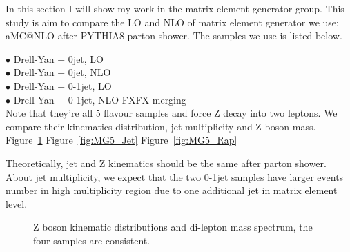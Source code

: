 \documentclass[12pt]{article} %
\begin{document}
In this section I will show my work in the matrix element generator group. This study is aim to compare the LO and NLO of matrix element generator we use: aMC@NLO after PYTHIA8 parton shower. The samples we use is listed below.

\noindent
$\bullet$ Drell-Yan + 0jet, LO \\
$\bullet$ Drell-Yan + 0jet, NLO \\
$\bullet$ Drell-Yan + 0-1jet, LO \\
$\bullet$ Drell-Yan + 0-1jet, NLO FXFX merging \\

Note that they're all 5 flavour samples and force Z decay into two leptons. We compare their kinematics distribution, jet multiplicity and Z boson mass. Figure~\ref{fig:MG5_Z} Figure~\ref{fig:MG5_Jet} Figure~\ref{fig:MG5_Rap}

Theoretically, jet and Z kinematics should be the same after parton shower. About jet multiplicity, we expect that the two 0-1jet samples have larger events number in high multiplicity region due to one additional jet in matrix element level.



\begin{figure}[H] %
  \caption{Z boson kinematic distributions and di-lepton mass spectrum, the four samples are consistent.}
  \label{fig:MG5_Z}
\end{figure}
\end{document}
